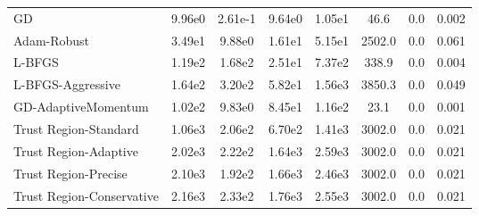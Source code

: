 \documentclass{article}
\begin{document}
\begin{table}[htbp]
{\begin{tabular}{p{2.5cm}*{7}{c}}
GD & 9.96e0 & 2.61e-1 & 9.64e0 & 1.05e1 & 46.6 & 0.0 & 0.002 \\
Adam-Robust & 3.49e1 & 9.88e0 & 1.61e1 & 5.15e1 & 2502.0 & 0.0 & 0.061 \\
L-BFGS & 1.19e2 & 1.68e2 & 2.51e1 & 7.37e2 & 338.9 & 0.0 & 0.004 \\
L-BFGS-Aggressive & 1.64e2 & 3.20e2 & 5.82e1 & 1.56e3 & 3850.3 & 0.0 & 0.049 \\
GD-AdaptiveMomentum & 1.02e2 & 9.83e0 & 8.45e1 & 1.16e2 & 23.1 & 0.0 & 0.001 \\
Trust Region-Standard & 1.06e3 & 2.06e2 & 6.70e2 & 1.41e3 & 3002.0 & 0.0 & 0.021 \\
Trust Region-Adaptive & 2.02e3 & 2.22e2 & 1.64e3 & 2.59e3 & 3002.0 & 0.0 & 0.021 \\
Trust Region-Precise & 2.10e3 & 1.92e2 & 1.66e3 & 2.46e3 & 3002.0 & 0.0 & 0.021 \\
Trust Region-Conservative & 2.16e3 & 2.33e2 & 1.76e3 & 2.55e3 & 3002.0 & 0.0 & 0.021 \\
\bottomrule
\end{tabular}
}
\end{table}
\end{document}
